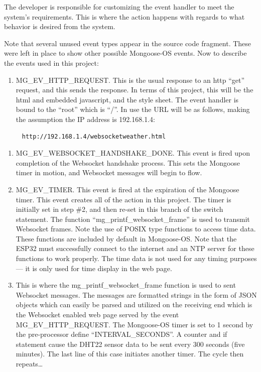 \documentclass[oneside,letterpaper,12pt]{book}
\providecommand{\tightlist}{%
  \setlength{\itemsep}{0pt}\setlength{\parskip}{0pt}}
\begin{document}
The developer is responsible for customizing the event handler to meet
the system's requirements. This is where the action happens with regards
to what behavior is desired from the system.

Note that several unused event types appear in the source code fragment.
These were left in place to show other possible Mongoose-OS events. Now
to describe the events used in this project:

\begin{enumerate}
\def\labelenumi{\arabic{enumi}.}
\tightlist
\item
  MG\_EV\_HTTP\_REQUEST. This is the usual response to an http ``get''
  request, and this sends the response. In terms of this project, this
  will be the html and embedded javascript, and the style sheet. The
  event handler is bound to the ``root'' which is ``/''. In use the URL
  will be as follows, making the assumption the IP address is
  192.168.1.4:
\end{enumerate}

\begin{verbatim}
     http://192.168.1.4/websocketweather.html
\end{verbatim}

\begin{enumerate}
\def\labelenumi{\arabic{enumi}.}
\setcounter{enumi}{1}
\tightlist
\item
  MG\_EV\_WEBSOCKET\_HANDSHAKE\_DONE. This event is fired upon
  completion of the Websocket handshake process. This sets the Mongoose
  timer in motion, and Websocket messages will begin to flow.
\item
  MG\_EV\_TIMER. This event is fired at the expiration of the Mongoose
  timer. This event creates all of the action in this project. The timer
  is initially set in step \#2, and then re-set in this branch of the
  switch statement. The function ``mg\_printf\_websocket\_frame'' is
  used to transmit Websocket frames. Note the use of POSIX type
  functions to access time data. These functions are included by default
  in Mongoose-OS. Note that the ESP32 must successfully connect to the
  internet and an NTP server for these functions to work properly. The
  time data is not used for any timing purposes--- it is only used for
  time display in the web page.
\item
  This is where the mg\_printf\_websocket\_frame function is used to
  sent Websocket messages. The messages are formatted strings in the
  form of JSON objects which can easily be parsed and utilized on the
  receiving end which is the Websocket enabled web page served by the
  event MG\_EV\_HTTP\_REQUEST. The Mongoose-OS timer is set to 1 second
  by the pre-processor define ``INTERVAL\_SECONDS''. A counter and if
  statement cause the DHT22 sensor data to be sent every 300 seconds
  (five minutes). The last line of this case initiates another timer.
  The cycle then repeats\ldots{}
\end{enumerate}
\end{document}
